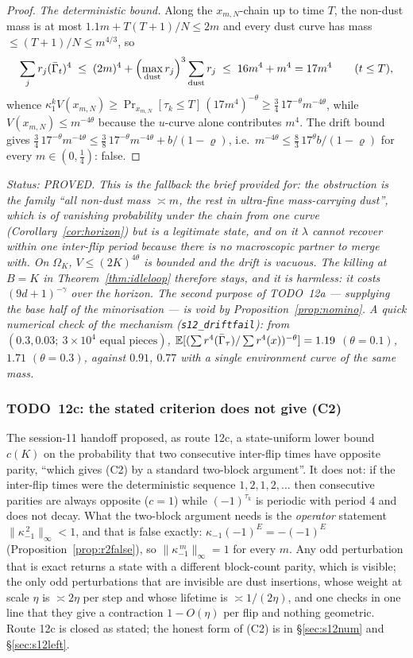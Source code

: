 \begin{proof}
\emph{The deterministic bound.}  Along the $x_{m,N}$-chain up to time
$T$, the non-dust mass is at most $1.1m+T(T+1)/N\le2m$ and every dust
curve has mass $\le(T+1)/N\le m^{4/3}$, so
\[
\sum_jr_j(\bar\Gamma_t)^4\;\le\;(2m)^4+\Bigl(\max_{\text{dust}}r_j\Bigr)^3
\sum_{\text{dust}}r_j\;\le\;16m^4+m^4=17m^4\qquad(t\le T),
\]
whence $\kappa_1^kV(x_{m,N})\ge\Pr_{x_{m,N}}[\tau_k\le T]\,(17m^4)^{-\theta}
\ge\tfrac34\,17^{-\theta}m^{-4\theta}$, while $V(x_{m,N})\le m^{-4\theta}$
because the $u$-curve alone contributes $m^4$.  The drift bound gives
$\tfrac34\,17^{-\theta}m^{-4\theta}\le\tfrac38\,17^{-\theta}m^{-4\theta}+b/(1-\varrho)$,
i.e.\ $m^{-4\theta}\le\tfrac83\,17^{\theta}b/(1-\varrho)$ for every
$m\in(0,\tfrac14)$: false.
\end{proof}

\emph{Status: PROVED.  This is the fallback the brief provided for: the
obstruction is the family ``all non-dust mass $\asymp m$, the rest in
ultra-fine mass-carrying dust'', which is of vanishing probability
under the chain from one curve (Corollary~\ref{cor:horizon}) but is a
legitimate state, and on it $\lambda$ cannot recover within one
inter-flip period because there is no macroscopic partner to merge
with.  On $\Omega_K$, $V\le(2K)^{4\theta}$ is bounded and the drift is
vacuous.  The killing at $B=K$ in Theorem~\ref{thm:idleloop} therefore
stays, and it is harmless: it costs $(9d+1)^{-\gamma}$ over the horizon.
The second purpose of TODO~12a --- supplying the base half of the
minorisation --- is void by Proposition~\ref{prop:nomino}.  A quick
numerical check of the mechanism (\texttt{s12\_driftfail}): from
$(0.3,0.03;\ 3\times10^4\text{ equal pieces})$, $\mathbb{E}[(\sum r^4(\bar\Gamma_\tau)/\sum r^4(x))^{-\theta}]=1.19$
$(\theta=0.1)$, $1.71$ $(\theta=0.3)$, against $0.91$, $0.77$ with a
single environment curve of the same mass.}

\subsubsection{TODO~12c: the stated criterion does not give (C2)}
\label{sec:s12odd}

The session-11 handoff proposed, as route 12c, a state-uniform lower
bound $c(K)$ on the probability that two consecutive inter-flip times
have opposite parity, ``which gives (C2) by a standard two-block
argument''.  It does not: if the inter-flip times were the
deterministic sequence $1,2,1,2,\dots$ then consecutive parities are
always opposite ($c=1$) while $(-1)^{\tau_k}$ is periodic with period
$4$ and does not decay.  What the two-block argument needs is the
\emph{operator} statement $\|\kappa_{-1}^{\,2}\|_\infty<1$, and that is
false exactly: $\kappa_{-1}(-1)^E=-(-1)^E$ (Proposition~\ref{prop:r2false}),
so $\|\kappa_{-1}^{\,m}\|_\infty=1$ for every $m$.  Any odd perturbation
that is exact returns a state with a different block-count parity,
which is visible; the only odd perturbations that are invisible are
dust insertions, whose weight at scale $\eta$ is $\asymp2\eta$ per step
and whose lifetime is $\asymp1/(2\eta)$, and one checks in one line
that they give a contraction $1-O(\eta)$ per flip and nothing
geometric.  Route 12c is closed as stated; the honest form of (C2) is
in \S\ref{sec:s12num} and \S\ref{sec:s12left}.

